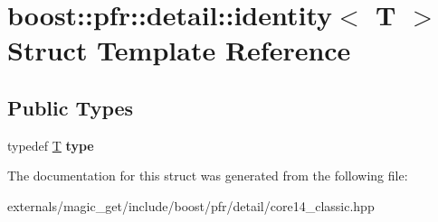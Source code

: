 \hypertarget{structboost_1_1pfr_1_1detail_1_1identity}{}\section{boost\+:\+:pfr\+:\+:detail\+:\+:identity$<$ T $>$ Struct Template Reference}
\label{structboost_1_1pfr_1_1detail_1_1identity}
\subsection*{Public Types}
\begin{DoxyCompactItemize}
\item 
\mbox{\label{structboost_1_1pfr_1_1detail_1_1identity_a1f9c198efc70caed0401de171d7e0a21}} 
typedef \mbox{\hyperlink{struct_t}{T}} {\bfseries type}
\end{DoxyCompactItemize}


The documentation for this struct was generated from the following file\+:\begin{DoxyCompactItemize}
\item 
externals/magic\+\_\+get/include/boost/pfr/detail/core14\+\_\+classic.\+hpp\end{DoxyCompactItemize}
